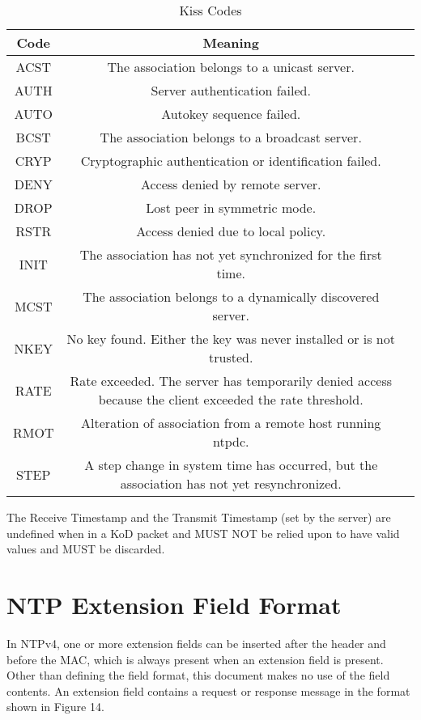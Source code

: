 \begin{table}[htb]
\center
\begin{tabular}{c | c | c}
Code & Meaning \\
\hline
\hline
ACST & The association belongs to a unicast server. \\
AUTH & Server authentication failed. \\
AUTO & Autokey sequence failed. \\
BCST & The association belongs to a broadcast server. \\
CRYP & Cryptographic authentication or identification failed. \\
DENY & Access denied by remote server. \\
DROP & Lost peer in symmetric mode. \\
RSTR & Access denied due to local policy. \\
INIT & The association has not yet synchronized for the first time. \\
MCST & The association belongs to a dynamically discovered server.\\
NKEY & No key found. Either the key was never installed or is not trusted. \\
RATE & Rate exceeded. The server has temporarily denied access because the client exceeded the rate threshold. \\
RMOT & Alteration of association from a remote host running ntpdc. \\
STEP & A step change in system time has occurred, but the association has not yet resynchronized. \\
\hline
\end{tabular}
\label{kiss_codes}
\caption{Kiss Codes}
\end{table}

The Receive Timestamp and the Transmit Timestamp (set by the server)
are undefined when in a KoD packet and MUST NOT be relied upon to
have valid values and MUST be discarded.

\section{NTP Extension Field Format}

In NTPv4, one or more extension fields can be inserted after the
header and before the MAC, which is always present when an extension
field is present. Other than defining the field format, this
document makes no use of the field contents. An extension field
contains a request or response message in the format shown in
Figure 14.


